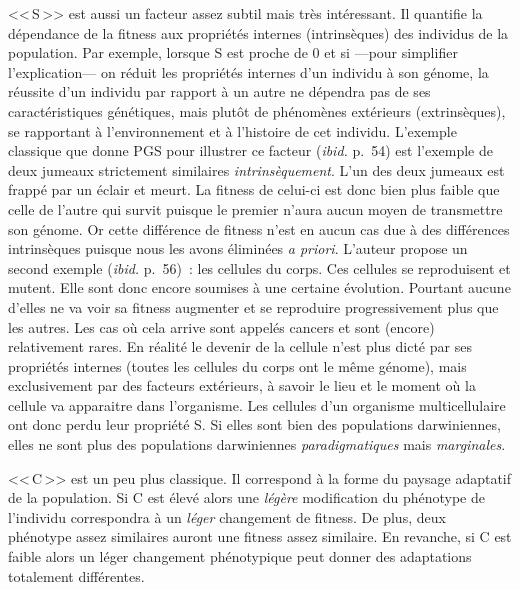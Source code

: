 <<\,S\,>> est aussi un facteur assez subtil mais très intéressant. Il quantifie la dépendance de la fitness aux propriétés internes (intrinsèques) des individus de la population. Par exemple, lorsque S est proche de 0 et si ---pour simplifier l'explication--- on réduit les propriétés internes d'un individu à son génome, la réussite d'un individu par rapport à un autre ne dépendra pas de ses caractéristiques génétiques, mais plutôt de phénomènes extérieurs (extrinsèques), se rapportant à l'environnement et à l'histoire de cet individu. L'exemple classique que donne PGS pour illustrer ce facteur (\emph{ibid.} p.~54) est l'exemple de deux jumeaux strictement similaires \emph{intrinsèquement}. L'un des deux jumeaux est frappé par un éclair et meurt. La fitness de celui-ci est donc bien plus faible que celle de l'autre qui survit puisque le premier n'aura aucun moyen de transmettre son génome. Or cette différence de fitness n'est en aucun cas due à des différences intrinsèques puisque nous les avons éliminées \emph{a priori}. L'auteur propose un second exemple (\emph{ibid.} p.~56)~: les cellules du corps. Ces cellules se reproduisent et mutent. Elle sont donc encore soumises à une certaine évolution. Pourtant aucune d'elles ne va voir sa fitness augmenter et se reproduire progressivement plus que les autres. Les cas où cela arrive sont appelés cancers et sont (encore) relativement rares. En réalité le devenir de la cellule n'est plus dicté par ses propriétés internes (toutes les cellules du corps ont le même génome), mais exclusivement par des facteurs extérieurs, à savoir le lieu et le moment où la cellule va apparaitre dans l'organisme. Les cellules d'un organisme multicellulaire ont donc perdu leur propriété S. Si elles sont bien des populations darwiniennes, elles ne sont plus des populations darwiniennes \emph{paradigmatiques} mais \emph{marginales}.

<<\,C\,>> est un peu plus classique. Il correspond à la forme du paysage adaptatif de la population. Si C est élevé alors une \emph{légère} modification du phénotype de l'individu correspondra à un \emph{léger} changement de fitness. De plus, deux phénotype assez similaires auront une fitness assez similaire. En revanche, si C est faible alors un léger changement phénotypique peut donner des adaptations totalement différentes.

